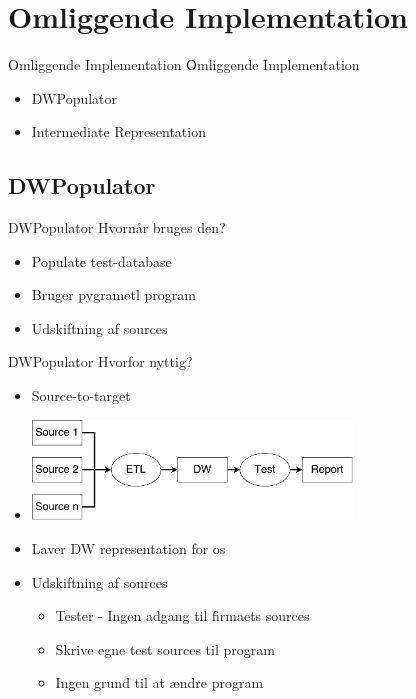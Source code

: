\section{Omliggende Implementation}

\begin{frame}{Omliggende Implementation}
	Omliggende Implementation
	\begin{itemize}
    \item<2-> DWPopulator
    \item<3-> Intermediate Representation
  \end{itemize}
\end{frame}

\subsection{DWPopulator}
\begin{frame}{DWPopulator}{}
  Hvornår bruges den?
  \begin{itemize}
    \item<1-> Populate test-database
    \item<2-> Bruger pygrametl program
    \item<3-> Udskiftning af sources
  \end{itemize}
\end{frame}

\begin{frame}{DWPopulator}{}
	Hvorfor nyttig?
  \begin{itemize}
		\item<1-> Source-to-target
		\item<2->[] \includegraphics[width=8.5cm]{figures/scenario.pdf}
		\item<3-> Laver DW representation for os
    \item<4-> Udskiftning af sources
			\begin{itemize}
				\item<5-> Tester - Ingen adgang til firmaets sources
				\item<6-> Skrive egne test sources til program
				\item<7-> Ingen grund til at ændre program
			\end{itemize}
  \end{itemize}
\end{frame}

